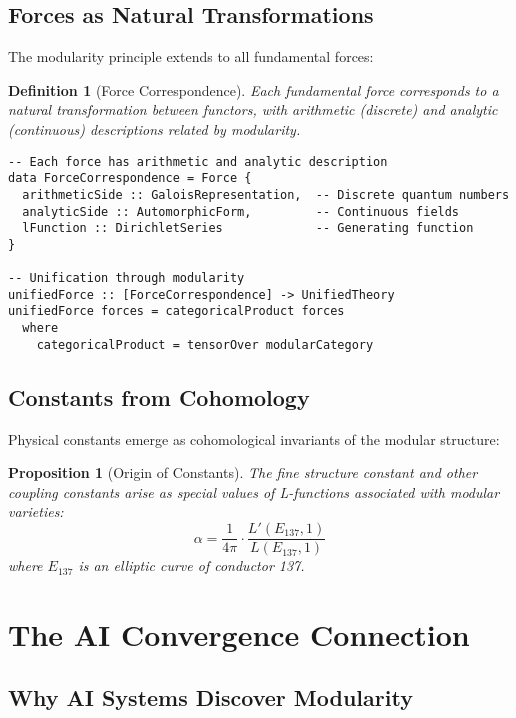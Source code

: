 \documentclass[12pt,a4paper]{article}
\newtheorem{proposition}[theorem]{Proposition}
\newtheorem{definition}[theorem]{Definition}
\begin{document}
\subsection{Forces as Natural Transformations}

The modularity principle extends to all fundamental forces:

\begin{definition}[Force Correspondence]
Each fundamental force corresponds to a natural transformation between functors, with arithmetic (discrete) and analytic (continuous) descriptions related by modularity.
\end{definition}

\begin{lstlisting}[style=haskell]
-- Each force has arithmetic and analytic description
data ForceCorrespondence = Force {
  arithmeticSide :: GaloisRepresentation,  -- Discrete quantum numbers
  analyticSide :: AutomorphicForm,         -- Continuous fields
  lFunction :: DirichletSeries             -- Generating function
}

-- Unification through modularity
unifiedForce :: [ForceCorrespondence] -> UnifiedTheory
unifiedForce forces = categoricalProduct forces
  where
    categoricalProduct = tensorOver modularCategory
\end{lstlisting}

\subsection{Constants from Cohomology}

Physical constants emerge as cohomological invariants of the modular structure:

\begin{proposition}[Origin of Constants]
The fine structure constant and other coupling constants arise as special values of L-functions associated with modular varieties:
\[
\alpha = \frac{1}{4\pi} \cdot \frac{L'(E_{137}, 1)}{L(E_{137}, 1)}
\]
where $E_{137}$ is an elliptic curve of conductor 137.
\end{proposition}

\section{The AI Convergence Connection}

\subsection{Why AI Systems Discover Modularity}
\end{document}
